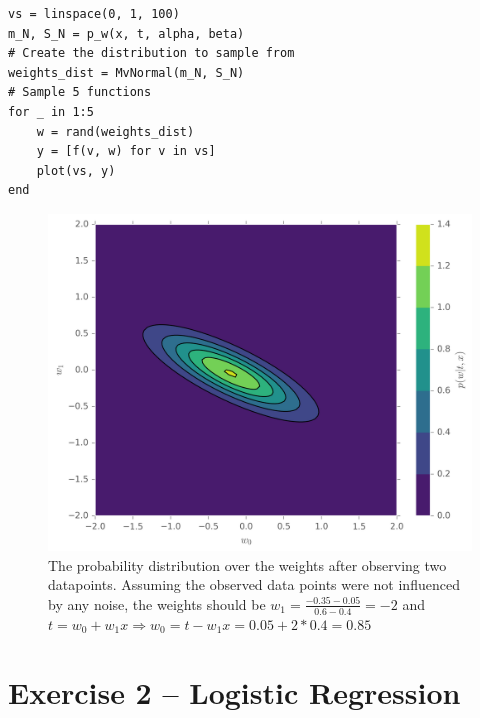 \documentclass{article}
\begin{document}
\begin{enumerate}
\begin{lstlisting}
vs = linspace(0, 1, 100)
m_N, S_N = p_w(x, t, alpha, beta)
# Create the distribution to sample from
weights_dist = MvNormal(m_N, S_N)
# Sample 5 functions
for _ in 1:5
    w = rand(weights_dist)
    y = [f(v, w) for v in vs]
    plot(vs, y)
end
\end{lstlisting}
\begin{figure}[H]
\centering
\includegraphics[width=.6\linewidth]{images/pw.png}
\caption{The probability distribution over the weights after observing two datapoints. Assuming the observed data points were not influenced by any noise, the weights should be $w_1=\frac{-0.35 - 0.05}{0.6 - 0.4}=-2$ and $t=w_0+w_1x \Rightarrow w_0=t-w_1x=0.05+2*0.4= 0.85$}
\label{fig:pw}
\end{figure}
\end{enumerate}

\section*{Exercise 2 -- Logistic Regression}
\end{document}
